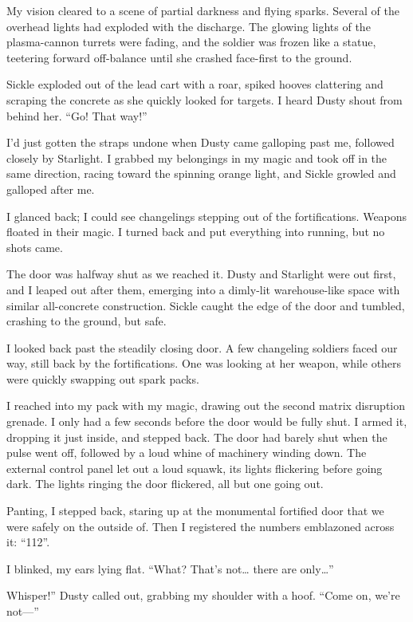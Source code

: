 My vision cleared to a scene of partial darkness and flying sparks. Several of the overhead lights had exploded with the discharge. The glowing lights of the plasma-cannon turrets were fading, and the soldier was frozen like a statue, teetering forward off-balance until she crashed face-first to the ground.

Sickle exploded out of the lead cart with a roar, spiked hooves clattering and scraping the concrete as she quickly looked for targets. I heard Dusty shout from behind her. “Go! That way!”

I’d just gotten the straps undone when Dusty came galloping past me, followed closely by Starlight. I grabbed my belongings in my magic and took off in the same direction, racing toward the spinning orange light, and Sickle growled and galloped after me.

I glanced back; I could see changelings stepping out of the fortifications. Weapons floated in their magic. I turned back and put everything into running, but no shots came.

The door was halfway shut as we reached it. Dusty and Starlight were out first, and I leaped out after them, emerging into a dimly-lit warehouse-like space with similar all-concrete construction. Sickle caught the edge of the door and tumbled, crashing to the ground, but safe.

I looked back past the steadily closing door. A few changeling soldiers faced our way, still back by the fortifications. One was looking at her weapon, while others were quickly swapping out spark packs.

I reached into my pack with my magic, drawing out the second matrix disruption grenade. I only had a few seconds before the door would be fully shut. I armed it, dropping it just inside, and stepped back. The door had barely shut when the pulse went off, followed by a loud whine of machinery winding down. The external control panel let out a loud squawk, its lights flickering before going dark. The lights ringing the door flickered, all but one going out.

Panting, I stepped back, staring up at the monumental fortified door that we were safely on the outside of. Then I registered the numbers emblazoned across it: “112”.

I blinked, my ears lying flat. “What? That’s not… there are only…”

\leavevmode{}Whisper!” Dusty called out, grabbing my shoulder with a hoof. “Come on, we’re not—”

